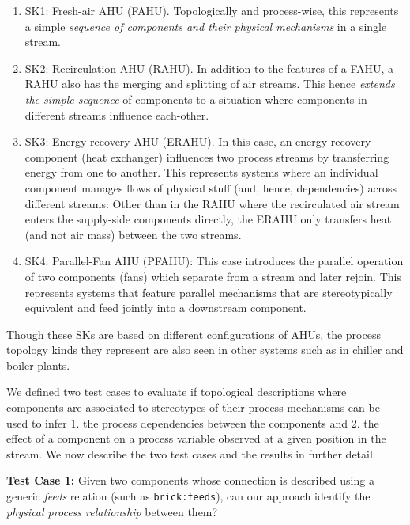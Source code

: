 \documentclass[sigconf]{acmart}
\begin{document}
\begin{enumerate}
    \item SK1: Fresh-air AHU (FAHU). Topologically and process-wise, this represents a simple \emph{sequence of components and their physical mechanisms} in a single stream. 
    
    \item SK2: Recirculation AHU (RAHU). In addition to the features of a FAHU, a RAHU also has the merging and splitting of air streams. This hence \emph{extends the simple sequence} of components to a situation where components in different streams influence each-other.
    
    \item SK3: Energy-recovery AHU (ERAHU). In this case, an energy recovery component (heat exchanger) influences two process streams by transferring energy from one to another.
    This represents systems where an individual component manages flows of physical stuff (and, hence, dependencies) across different streams: Other than in the RAHU where the recirculated air stream enters the supply-side components directly, the ERAHU only transfers heat (and not air mass) between the two streams.
    
    \item SK4: Parallel-Fan AHU (PFAHU): This case introduces the parallel operation of two components (fans) which separate from a stream and later rejoin.
    This represents systems that feature parallel mechanisms that are stereotypically equivalent and feed jointly into a downstream component.
 
\end{enumerate}

Though these SKs are based on different configurations of AHUs, the process topology kinds they represent are also seen in other systems such as in chiller and boiler plants.

We defined two test cases to evaluate if topological descriptions where components are associated to stereotypes of their process mechanisms can be used to infer 1. the process dependencies between the components and 2. the effect of a component on a process variable observed at a given position in the stream.
We now describe the two test cases and the results in further detail.

\textbf{Test Case 1:} Given two components whose connection is described using a generic \textit{feeds} relation (such as \texttt{brick:feeds}), can our approach identify the \textit{physical process relationship} between them?
\end{document}
